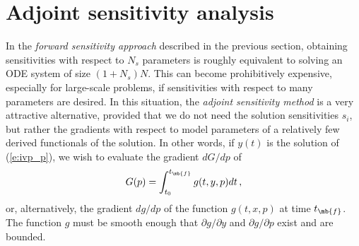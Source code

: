 \section{Adjoint sensitivity analysis}\label{ss:adj_sensi}
In the {\em forward sensitivity approach} described in the previous
section, obtaining sensitivities with respect to $N_s$ parameters is roughly
equivalent to solving an ODE system of size $(1+N_s) N$. This can become 
prohibitively expensive, especially for large-scale problems, if sensitivities
with respect to many parameters are desired.
In this situation, the {\em adjoint sensitivity method} is a very
attractive alternative, provided that we do not need the solution sensitivities
$s_i$, but rather the gradients with respect to model parameters of a relatively 
few derived functionals of the solution. In other words, if $y(t)$ is the solution
of (\ref{e:ivp_p}), we wish to evaluate the gradient ${dG}/{dp}$ of
\begin{equation}\label{e:G}
G(p) = \int_{t_0}^{t_\mb{f}} g(t, y, p) dt \, ,
\end{equation}
or, alternatively, the gradient ${dg}/{dp}$ of the function $g(t, x, p)$ 
at time $t_\mb{f}$. 
The function $g$ must be smooth enough that $\partial g / \partial y$ 
and $\partial g / \partial p$ exist and are bounded. 


